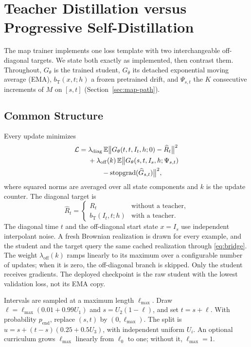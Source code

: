\section{Teacher Distillation versus Progressive Self-Distillation}\label{app:training-modes}
The map trainer implements one loss template with two interchangeable off-diagonal targets. We state both exactly as implemented, then contrast them. Throughout, $G_\theta$ is the trained student, $G_{\bar\theta}$ its detached exponential moving average (EMA), $b_{\mathrm T}(x,t;h)$ a frozen pretrained drift, and $\Psi_{s,t}$ the $K$ consecutive increments of $M$ on $[s,t]$ (Section~\ref{sec:map-path}).

\subsection{Common Structure}
Every update minimizes
\begin{align}
 \mathcal L={}&\lambda_{\mathrm{diag}}\,\mathbb{E}\big\|G_\theta(t,t,I_t,h;0)-\widehat R_t\big\|^2\nonumber\\
 &+\lambda_{\mathrm{off}}(k)\,\mathbb{E}\big\|G_\theta(s,t,I_s,h;\Psi_{s,t})\nonumber\\
 &\qquad-\operatorname{stopgrad}(\widehat G_{s,t})\big\|^2,
 \label{eq:common-loss}
\end{align}
where squared norms are averaged over all state components and $k$ is the update counter. The diagonal target is
\begin{equation}
 \widehat R_t=
 \begin{cases}
 R_t & \text{without a teacher},\\
 b_{\mathrm T}(I_t,t;h) & \text{with a teacher}.
 \end{cases}
 \label{eq:diag-target}
\end{equation}
The diagonal time $t$ and the off-diagonal start state $x=I_s$ use independent interpolant noise. A fresh Brownian realization is drawn for every example, and the student and the target query the same cached realization through \eqref{eq:bridge}. The weight $\lambda_{\mathrm{off}}(k)$ ramps linearly to its maximum over a configurable number of updates; when it is zero, the off-diagonal branch is skipped. Only the student receives gradients. The deployed checkpoint is the raw student with the lowest validation loss, not its EMA copy.

Intervals are sampled at a maximum length $\ell_{\max}$. Draw $\ell=\ell_{\max}(0.01+0.99U_1)$ and $s=U_2(1-\ell)$, and set $t=s+\ell$. With probability $p_{\mathrm{end}}$, replace $(s,t)$ by $(0,\ell_{\max})$. The split is $u=s+(t-s)(0.25+0.5U_3)$, with independent uniform $U_i$. An optional curriculum grows $\ell_{\max}$ linearly from $\ell_0$ to one; without it, $\ell_{\max}=1$.

